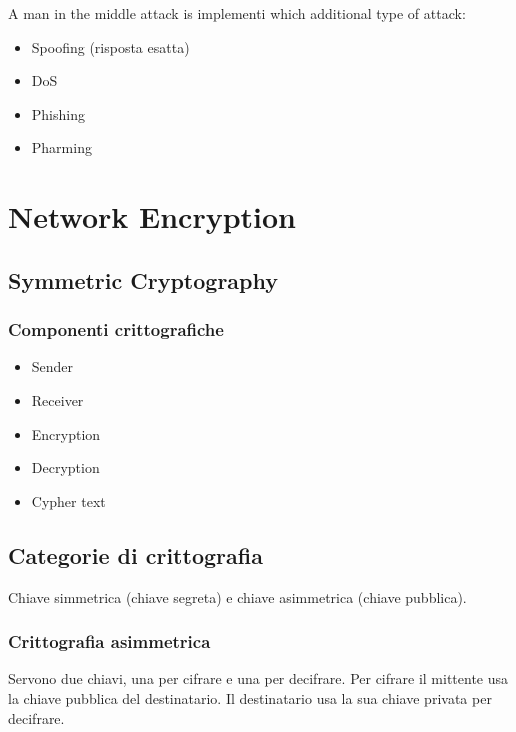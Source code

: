 
A man in the middle attack is implementi which additional type of attack:
\begin{itemize}

\item Spoofing (risposta esatta)
\item DoS
\item Phishing
\item Pharming

\end{itemize}



\section{Network Encryption}

\subsection{Symmetric Cryptography}

\subsubsection{Componenti crittografiche}

\begin{itemize}
\item Sender
\item Receiver
\item Encryption
\item Decryption
\item Cypher text
\end{itemize}

\subsection{Categorie di crittografia}

Chiave simmetrica (chiave segreta) e chiave asimmetrica (chiave pubblica).

\subsubsection{Crittografia asimmetrica}

Servono due chiavi, una per cifrare e una per decifrare. Per cifrare il mittente 
usa la chiave pubblica del destinatario. Il destinatario usa la sua chiave 
privata per decifrare.

